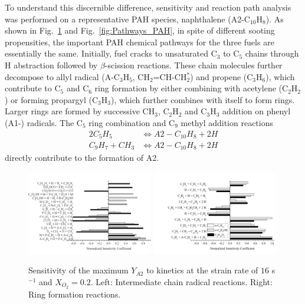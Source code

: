 \documentclass[preprint,3p,times,twocolumn]{elsarticleUS}
\begin{document}
To understand this discernible difference, sensitivity and reaction path analysis was performed on a representative PAH species, naphthalene (A2-C$_{10}$H$_8$). As shown in Fig.~\ref{fig:SA4} and Fig.~\ref{fig:Pathways_PAH}, in spite of different sooting propensities, the important PAH chemical pathways for the three fuels are essentially the same. Initially, fuel cracks to unsaturated C$_3$ to C$_5$ chains through H abstraction followed by $\beta$-scission reactions. These chain molecules further decompose to allyl radical (A-C$_3$H$_5$, CH$_2$=CH-CH$_2^*$) and propene (C$_3$H$_6$), which contribute to C$_5$ and C$_6$ ring formation by either combining with acetylene (C$_2$H$_2$) or forming propargyl (C$_3$H$_3$), which further combines with itself to form rings. Larger rings are formed by successive CH$_3$, C$_2$H$_2$ and C$_3$H$_3$ addition on phenyl (A1-) radicals. The C$_5$ ring combination and C$_9$ methyl addition reactions
\begin{align*}
  2 C_5H_5 &\Longleftrightarrow A2-C_{10}H_8 + 2 H\\
  C_9H_7 + CH_3 &\Longleftrightarrow A2-C_{10}H_8 + 2 H
\end{align*}
directly contribute to the formation of A2. 

\begin{figure}[ht]
  \centering
  \scriptsize
  \includegraphics[trim=0mm 0mm 0mm 8mm, clip=true,width=0.49\textwidth]{Chain.png}
  \includegraphics[trim=0mm 0mm 0mm 8mm, clip=true,width=0.49\textwidth]{Ring.png}
  \normalsize
  \vspace{-0.2in}
  \caption{Sensitivity of the maximum $Y_{A2}$ to kinetics at the strain rate of $16$ s$^{-1}$ and $X_{O_2}=0.2$. Left: Intermediate chain radical reactions. Right: Ring formation reactions.}
  \label{fig:SA4}
\end{figure}
\end{document}
